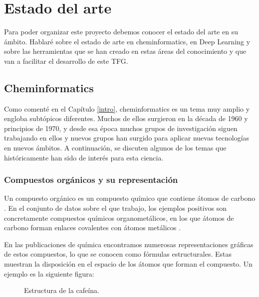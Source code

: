 \chapter{Estado del arte}
Para poder organizar este proyecto debemos conocer el estado del arte en su ámbito. Hablaré sobre el estado de arte en cheminformatics, en Deep Learning y sobre las herramientas que se han creado en estas áreas del conocimiento y que  van a facilitar el desarrollo de este TFG.

\section{Cheminformatics}
Como comenté en el Capítulo \ref{intro}, cheminformatics es un tema muy amplio y engloba subtópicos diferentes. Muchos de ellos surgieron en la década de 1960 y principios de 1970, y desde esa época muchos grupos de investigación siguen trabajando en ellos y nuevos grupos han surgido para aplicar nuevas tecnologías en nuevos ámbitos. A continuación, se discuten algunos de los temas que históricamente han sido de interés para esta ciencia. \cite{doi:10.1021/ci600234z}

\subsection{Compuestos orgánicos y su representación}
Un compuesto orgánico es un compuesto químico que contiene átomos de carbono \cite{mcmurry2008quimica}. En el conjunto de datos sobre el que trabajo, los ejemplos positivos son concretamente compuestos químicos organometálicos, en los que átomos de carbono forman enlaces covalentes con átomos metálicos \cite{mcmurry2008quimica}.

En las publicaciones de química encontramos numerosas representaciones gráficas de estos compuestos, lo que se conocen como fórmulas estructurales. Estas muestran la disposición en el espacio de los átomos que forman el compuesto. Un ejemplo es la siguiente figura:

\begin{figure}[H]
\centering
    \caption{Estructura de la cafeína. \cite{decimer}}
    \label{fig:caffeine}
\end{figure}


